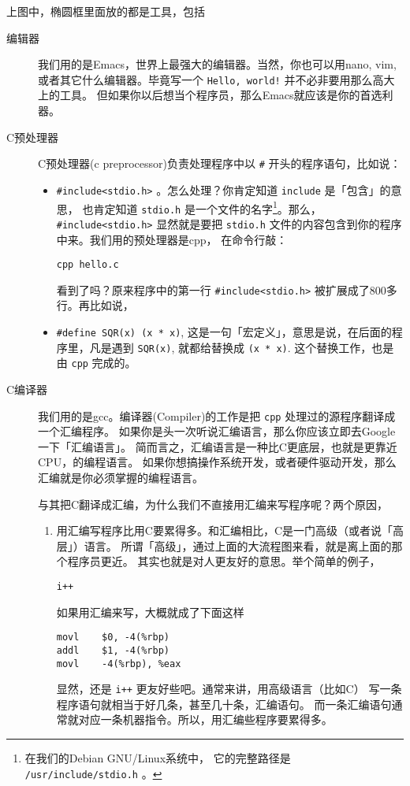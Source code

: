 \documentclass{wx672article}
\begin{document}
上图中，椭圆框里面放的都是工具，包括
\begin{description}
\item[{编辑器}] 我们用的是Emacs，世界上最强大的编辑器。当然，你也可以用nano, vim,
或者其它什么编辑器。毕竟写一个 \texttt{Hello, world!} 并不必非要用那么高大上的工具。
但如果你以后想当个程序员，那么Emacs就应该是你的首选利器。

\item[{C预处理器}] C预处理器(c preprocessor)负责处理程序中以 \texttt{\#} 开头的程序语句，比如说：
\begin{itemize}
\item \texttt{\#include<stdio.h>} 。怎么处理？你肯定知道 \texttt{include} 是「包含」的意思，
也肯定知道 \texttt{stdio.h} 是一个文件的名字\footnote{在我们的Debian GNU/Linux系统中，
       它的完整路径是 \texttt{/usr/include/stdio.h} 。}。那么， \texttt{\#include<stdio.h>}
显然就是要把 \texttt{stdio.h} 文件的内容包含到你的程序中来。我们用的预处理器是cpp，
在命令行敲：
\begin{verbatim}
cpp hello.c
\end{verbatim}
看到了吗？原来程序中的第一行 \texttt{\#include<stdio.h>} 被扩展成了800多行。再比如说，
\item \texttt{\#define SQR(x) (x * x)}, 这是一句「宏定义」，意思是说，在后面的程序里，凡是遇到
\texttt{SQR(x)}, 就都给替换成 \texttt{(x * x)}. 这个替换工作，也是由 \texttt{cpp} 完成的。
\end{itemize}

\item[{C编译器}] 我们用的是gcc。编译器(Compiler)的工作是把 \texttt{cpp} 
处理过的源程序翻译成一个汇编程序。
如果你是头一次听说汇编语言，那么你应该立即去Google一下「汇编语言」。
简而言之，汇编语言是一种比C更底层，也就是更靠近CPU，的编程语言。
如果你想搞操作系统开发，或者硬件驱动开发，那么汇编就是你必须掌握的编程语言。

与其把C翻译成汇编，为什么我们不直接用汇编来写程序呢？两个原因，
\begin{enumerate}
\item 用汇编写程序比用C要累得多。和汇编相比，C是一门高级（或者说「高层」）语言。
所谓「高级」，通过上面的大流程图来看，就是离上面的那个程序员更近。
其实也就是对人更友好的意思。举个简单的例子，
\begin{verbatim}
i++
\end{verbatim}
如果用汇编来写，大概就成了下面这样
\begin{verbatim}
movl    $0, -4(%rbp)
addl    $1, -4(%rbp)
movl    -4(%rbp), %eax
\end{verbatim}
显然，还是 \texttt{i++} 更友好些吧。通常来讲，用高级语言（比如C）
写一条程序语句就相当于好几条，甚至几十条，汇编语句。
而一条汇编语句通常就对应一条机器指令。所以，用汇编些程序要累得多。


\end{enumerate}
\end{description}
\end{document}
